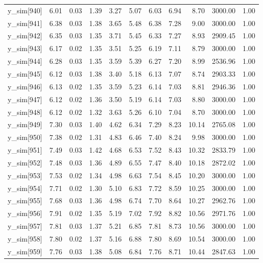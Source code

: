 \begin{table}[ht]
\begin{tabular}{rrrrrrrrrrr}
  y\_sim[940] & 6.01 & 0.03 & 1.39 & 3.27 & 5.07 & 6.03 & 6.94 & 8.70 & 3000.00 & 1.00 \\ 
  y\_sim[941] & 6.38 & 0.03 & 1.38 & 3.65 & 5.48 & 6.38 & 7.28 & 9.00 & 3000.00 & 1.00 \\ 
  y\_sim[942] & 6.35 & 0.03 & 1.35 & 3.71 & 5.45 & 6.33 & 7.27 & 8.93 & 2909.45 & 1.00 \\ 
  y\_sim[943] & 6.17 & 0.02 & 1.35 & 3.51 & 5.25 & 6.19 & 7.11 & 8.79 & 3000.00 & 1.00 \\ 
  y\_sim[944] & 6.28 & 0.03 & 1.35 & 3.59 & 5.39 & 6.27 & 7.20 & 8.99 & 2536.96 & 1.00 \\ 
  y\_sim[945] & 6.12 & 0.03 & 1.38 & 3.40 & 5.18 & 6.13 & 7.07 & 8.74 & 2903.33 & 1.00 \\ 
  y\_sim[946] & 6.13 & 0.02 & 1.35 & 3.59 & 5.23 & 6.14 & 7.03 & 8.81 & 2946.36 & 1.00 \\ 
  y\_sim[947] & 6.12 & 0.02 & 1.36 & 3.50 & 5.19 & 6.14 & 7.03 & 8.80 & 3000.00 & 1.00 \\ 
  y\_sim[948] & 6.12 & 0.02 & 1.32 & 3.63 & 5.26 & 6.10 & 7.04 & 8.70 & 3000.00 & 1.00 \\ 
  y\_sim[949] & 7.30 & 0.03 & 1.40 & 4.62 & 6.34 & 7.29 & 8.23 & 10.14 & 2765.08 & 1.00 \\ 
  y\_sim[950] & 7.38 & 0.02 & 1.31 & 4.83 & 6.46 & 7.40 & 8.24 & 9.98 & 3000.00 & 1.00 \\ 
  y\_sim[951] & 7.49 & 0.03 & 1.42 & 4.68 & 6.53 & 7.52 & 8.43 & 10.32 & 2833.79 & 1.00 \\ 
  y\_sim[952] & 7.48 & 0.03 & 1.36 & 4.89 & 6.55 & 7.47 & 8.40 & 10.18 & 2872.02 & 1.00 \\ 
  y\_sim[953] & 7.53 & 0.02 & 1.34 & 4.98 & 6.63 & 7.54 & 8.45 & 10.20 & 3000.00 & 1.00 \\ 
  y\_sim[954] & 7.71 & 0.02 & 1.30 & 5.10 & 6.83 & 7.72 & 8.59 & 10.25 & 3000.00 & 1.00 \\ 
  y\_sim[955] & 7.68 & 0.03 & 1.36 & 4.98 & 6.74 & 7.70 & 8.64 & 10.27 & 2962.76 & 1.00 \\ 
  y\_sim[956] & 7.91 & 0.02 & 1.35 & 5.19 & 7.02 & 7.92 & 8.82 & 10.56 & 2971.76 & 1.00 \\ 
  y\_sim[957] & 7.81 & 0.03 & 1.37 & 5.21 & 6.85 & 7.81 & 8.73 & 10.56 & 3000.00 & 1.00 \\ 
  y\_sim[958] & 7.80 & 0.02 & 1.37 & 5.16 & 6.88 & 7.80 & 8.69 & 10.54 & 3000.00 & 1.00 \\ 
  y\_sim[959] & 7.76 & 0.03 & 1.38 & 5.08 & 6.84 & 7.76 & 8.71 & 10.44 & 2847.63 & 1.00 \\ 

\end{tabular}
\end{table}
